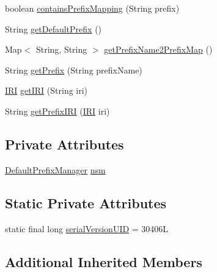 \begin{DoxyCompactItemize}
boolean \hyperlink{classorg_1_1semanticweb_1_1owlapi_1_1vocab_1_1_prefix_o_w_l_ontology_format_a0f60900e238d4dca5552526d2c5025d4}{contains\-Prefix\-Mapping} (String prefix)
\item 
String \hyperlink{classorg_1_1semanticweb_1_1owlapi_1_1vocab_1_1_prefix_o_w_l_ontology_format_a4320b2a7d260ff8bda65041f221f6a82}{get\-Default\-Prefix} ()
\item 
Map$<$ String, String $>$ \hyperlink{classorg_1_1semanticweb_1_1owlapi_1_1vocab_1_1_prefix_o_w_l_ontology_format_a64549cfce6c3d56b12129808ca737354}{get\-Prefix\-Name2\-Prefix\-Map} ()
\item 
String \hyperlink{classorg_1_1semanticweb_1_1owlapi_1_1vocab_1_1_prefix_o_w_l_ontology_format_af1f2a0740b5c0963099309bc61343797}{get\-Prefix} (String prefix\-Name)
\item 
\hyperlink{classorg_1_1semanticweb_1_1owlapi_1_1model_1_1_i_r_i}{I\-R\-I} \hyperlink{classorg_1_1semanticweb_1_1owlapi_1_1vocab_1_1_prefix_o_w_l_ontology_format_afe6c462ecea8669dddd352dfb03e4034}{get\-I\-R\-I} (String iri)
\item 
String \hyperlink{classorg_1_1semanticweb_1_1owlapi_1_1vocab_1_1_prefix_o_w_l_ontology_format_a60000f38cd6250eb6b9a3d4fce6b00cc}{get\-Prefix\-I\-R\-I} (\hyperlink{classorg_1_1semanticweb_1_1owlapi_1_1model_1_1_i_r_i}{I\-R\-I} iri)
\end{DoxyCompactItemize}
\subsection*{Private Attributes}
\begin{DoxyCompactItemize}
\item 
\hyperlink{classorg_1_1semanticweb_1_1owlapi_1_1util_1_1_default_prefix_manager}{Default\-Prefix\-Manager} \hyperlink{classorg_1_1semanticweb_1_1owlapi_1_1vocab_1_1_prefix_o_w_l_ontology_format_a2b227aef2f67e9e905d9dbd623c697be}{nsm}
\end{DoxyCompactItemize}
\subsection*{Static Private Attributes}
\begin{DoxyCompactItemize}
\item 
static final long \hyperlink{classorg_1_1semanticweb_1_1owlapi_1_1vocab_1_1_prefix_o_w_l_ontology_format_a380f930640e093084d9baa92f07e7af2}{serial\-Version\-U\-I\-D} = 30406\-L
\end{DoxyCompactItemize}
\subsection*{Additional Inherited Members}


